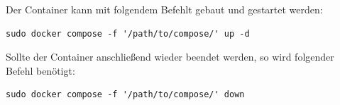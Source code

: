Der Container kann mit folgendem Befehlt gebaut und gestartet werden:
\begin{lstlisting}
sudo docker compose -f '/path/to/compose/' up -d
\end{lstlisting}

Sollte der Container anschließend wieder beendet werden, so wird folgender Befehl benötigt: 
\begin{lstlisting}
sudo docker compose -f '/path/to/compose/' down
\end{lstlisting}